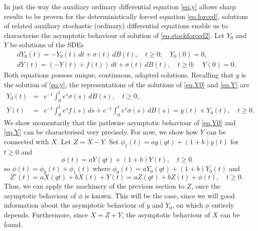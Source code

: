\documentclass[a4paper,10pt,reqno]{amsart}
\numberwithin{equation}{section}
\theoremstyle{definition}
\theoremstyle{remark}
\DeclareMathOperator{\1}{\mathbbm 1}
\begin{document}
In just the way the auxiliary ordinary differential equation \eqref{eq.y} allows sharp results to be proven for the deterministically forced equation \eqref{eq.forced}, solutions of related auxiliary stochastic (ordinary) differential equations enable us to characterise the asymptotic behaviour of solution of \eqref{eq.stochforced2}. Let $Y_0$ and $Y$ be solutions of the SDEs
\begin{gather} \label{eq.Y0}
dY_0(t)=-Y_0(t)\,dt+\sigma(t)\,dB(t), \quad t\geq 0; \quad Y_0(0)=0,	\\
\label{eq.Y}
dY(t)=(-Y(t)+f(t))\,dt + \sigma(t)\,dB(t), \quad t\geq 0; \quad Y(0)=0.
\end{gather}
Both equations possess unique, continuous, adapted solutions. Recalling that $y$ is the solution of \eqref{eq.y}, the representations of the solutions of \eqref{eq.Y0} and \eqref{eq.Y} are 
\begin{eqnarray} \label{eq.Y0rep}
Y_0(t)&=&e^{-t}\int_0^t e^s \sigma(s)\,dB(s), \quad t\geq 0, \\
\label{eq.Yrep}
Y(t)&=&e^{-t}\int_0^t e^s f(s)\,ds+e^{-t}\int_0^t e^s \sigma(s)\,dB(s) = y(t)+Y_0(t), \quad t\geq 0.
\end{eqnarray} 
We show momentarily that the pathwise asymptotic behaviour of \eqref{eq.Y0} and \eqref{eq.Y} can be characterised very precisely. For now, we show how 
$Y$ can be connected with $X$. Let 
$Z=X-Y$. 
Set $\phi_1(t)=ay(qt)+(1+b)y(t)$ for $t\geq 0$ and %
\begin{equation} \label{eq.phistoch}
\phi(t)= aY(qt)+(1+b)Y(t), \quad t\geq 0
\end{equation}
so $\phi(t)=\phi_0(t)+\phi_1(t)$ where  $\phi_0(t)=aY_0(qt)+(1+b)Y_0(t)$ and  
\begin{equation} \label{eq.Z}
Z'(t)=aX(qt)+bX(t)+Y(t) = aZ(qt)+bZ(t)+\phi(t), \quad t\geq 0.
\end{equation}
Thus, we can apply the machinery of the previous section to $Z$, %
once the asymptotic behaviour of $\phi$ is known. This will be the case, since we will good information about the asymptotic behaviour of $y$ and $Y_0$, on which $\phi$ entirely depends. Furthermore, since %
$X=Z+Y$, the asymptotic behaviour of %
$X$ can be found. 
\end{document}
